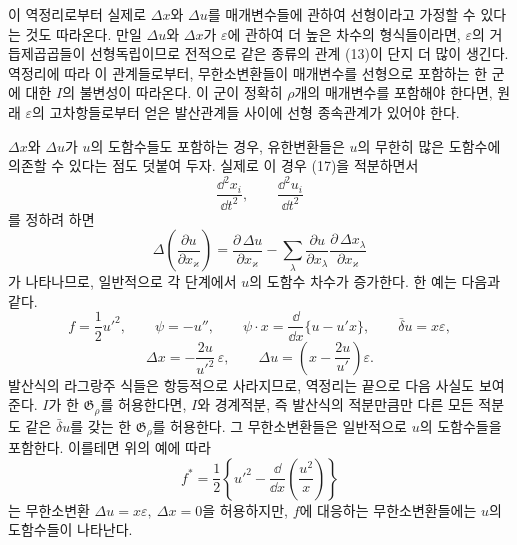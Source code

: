 이 역정리로부터 실제로 \(\Delta x\)와 \(\Delta u\)를 매개변수들에 관하여 선형이라고 가정할 수 있다는 것도 따라온다. 만일 \(\Delta u\)와 \(\Delta x\)가 \(\varepsilon\)에 관하여 더 높은 차수의 형식들이라면, \(\varepsilon\)의 거듭제곱곱들이 선형독립이므로 전적으로 같은 종류의 관계 (13)이 단지 더 많이 생긴다. 역정리에 따라 이 관계들로부터, 무한소변환들이 매개변수를 선형으로 포함하는 한 군에 대한 \(I\)의 불변성이 따라온다. 이 군이 정확히 \(\rho\)개의 매개변수를 포함해야 한다면, 원래 \(\varepsilon\)의 고차항들로부터 얻은 발산관계들 사이에 선형 종속관계가 있어야 한다.

\(\Delta x\)와 \(\Delta u\)가 \(u\)의 도함수들도 포함하는 경우, 유한변환들은 \(u\)의 무한히 많은 도함수에 의존할 수 있다는 점도 덧붙여 두자. 실제로 이 경우 (17)을 적분하면서
\[
\frac{\dd^2x_i}{\dd t^2},\qquad
\frac{\dd^2u_i}{\dd t^2}
\]
를 정하려 하면
\[
\Delta\!\left(\frac{\partial u}{\partial x_\varkappa}\right)
=\frac{\partial\,\Delta u}{\partial x_\varkappa}
-\sum_\lambda\frac{\partial u}{\partial x_\lambda}
\frac{\partial\,\Delta x_\lambda}{\partial x_\varkappa}
\]
가 나타나므로, 일반적으로 각 단계에서 \(u\)의 도함수 차수가 증가한다. 한 예는 다음과 같다.
\[
f=\frac12u'^2,\qquad
\psi=-u'',\qquad
\psi\cdot x=\frac{\dd}{\dd x}\{u-u'x\},\qquad
\bar\delta u=x\varepsilon,
\]
\[
\Delta x=-\frac{2u}{u'^2}\,\varepsilon,\qquad
\Delta u=\left(x-\frac{2u}{u'}\right)\varepsilon.
\]
발산식의 라그랑주 식들은 항등적으로 사라지므로, 역정리는 끝으로 다음 사실도 보여 준다. \(I\)가 한 \(\mathfrak G_\rho\)를 허용한다면, \(I\)와 경계적분, 즉 발산식의 적분만큼만 다른 모든 적분도 같은 \(\bar\delta u\)를 갖는 한 \(\mathfrak G_\rho\)를 허용한다. 그 무한소변환들은 일반적으로 \(u\)의 도함수들을 포함한다. 이를테면 위의 예에 따라
\[
f^*=\frac12\left\{u'^2-\frac{\dd}{\dd x}\left(\frac{u^2}{x}\right)\right\}
\]
는 무한소변환 \(\Delta u=x\varepsilon,\ \Delta x=0\)을 허용하지만, \(f\)에 대응하는 무한소변환들에는 \(u\)의 도함수들이 나타난다.

